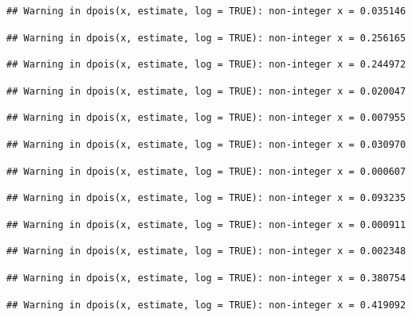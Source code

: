 \documentclass[]{article}
\begin{document}
\begin{verbatim}
## Warning in dpois(x, estimate, log = TRUE): non-integer x = 0.035146
\end{verbatim}

\begin{verbatim}
## Warning in dpois(x, estimate, log = TRUE): non-integer x = 0.256165
\end{verbatim}

\begin{verbatim}
## Warning in dpois(x, estimate, log = TRUE): non-integer x = 0.244972
\end{verbatim}

\begin{verbatim}
## Warning in dpois(x, estimate, log = TRUE): non-integer x = 0.020047
\end{verbatim}

\begin{verbatim}
## Warning in dpois(x, estimate, log = TRUE): non-integer x = 0.007955
\end{verbatim}

\begin{verbatim}
## Warning in dpois(x, estimate, log = TRUE): non-integer x = 0.030970
\end{verbatim}

\begin{verbatim}
## Warning in dpois(x, estimate, log = TRUE): non-integer x = 0.000607
\end{verbatim}

\begin{verbatim}
## Warning in dpois(x, estimate, log = TRUE): non-integer x = 0.093235
\end{verbatim}

\begin{verbatim}
## Warning in dpois(x, estimate, log = TRUE): non-integer x = 0.000911
\end{verbatim}

\begin{verbatim}
## Warning in dpois(x, estimate, log = TRUE): non-integer x = 0.002348
\end{verbatim}

\begin{verbatim}
## Warning in dpois(x, estimate, log = TRUE): non-integer x = 0.380754
\end{verbatim}

\begin{verbatim}
## Warning in dpois(x, estimate, log = TRUE): non-integer x = 0.419092
\end{verbatim}
\end{document}
